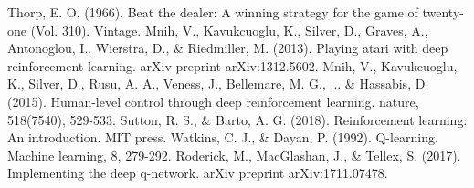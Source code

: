 \documentclass[conference]{IEEEtran}
\begin{document}
\begin{thebibliography}{00}
 Thorp, E. O. (1966). Beat the dealer: A winning strategy for the game of twenty-one (Vol. 310). Vintage.
 Mnih, V., Kavukcuoglu, K., Silver, D., Graves, A., Antonoglou, I., Wierstra, D., \& Riedmiller, M. (2013). Playing atari with deep reinforcement learning. arXiv preprint arXiv:1312.5602.
 Mnih, V., Kavukcuoglu, K., Silver, D., Rusu, A. A., Veness, J., Bellemare, M. G., ... \& Hassabis, D. (2015). Human-level control through deep reinforcement learning. nature, 518(7540), 529-533.
 Sutton, R. S., \& Barto, A. G. (2018). Reinforcement learning: An introduction. MIT press.
 Watkins, C. J., \& Dayan, P. (1992). Q-learning. Machine learning, 8, 279-292.
 Roderick, M., MacGlashan, J., \& Tellex, S. (2017). Implementing the deep q-network. arXiv preprint arXiv:1711.07478.
\end{thebibliography}
\end{document}
